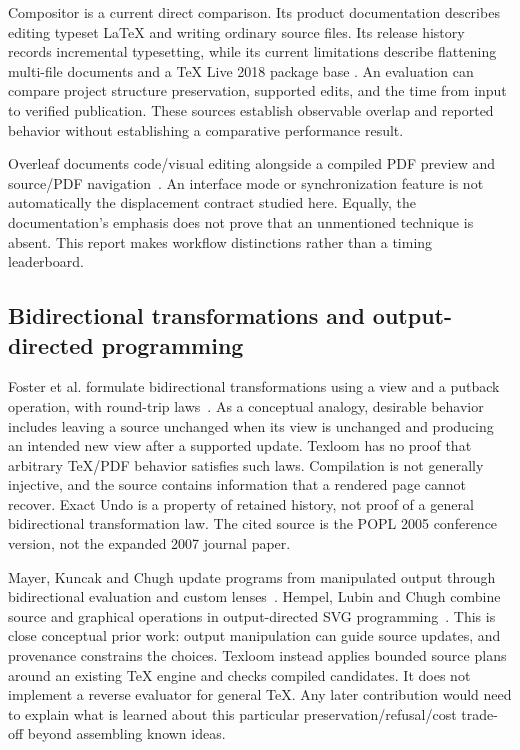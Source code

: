 Compositor is a current direct comparison. Its product documentation describes
editing typeset LaTeX and writing ordinary source files. Its release history
records incremental typesetting, while its current limitations describe
flattening multi-file documents and a TeX Live 2018 package base
\cite{compositor,compositorincremental}. An evaluation can compare project
structure preservation, supported edits, and the time from input to
verified publication. These sources establish observable overlap and
reported behavior without establishing a comparative performance result.

Overleaf documents code/visual editing alongside a compiled PDF preview and
source/PDF navigation~\cite{overleaf}. An interface mode or synchronization
feature is not automatically the displacement contract studied here. Equally,
the documentation's emphasis does not prove that an unmentioned technique is
absent. This report makes workflow distinctions rather than a timing leaderboard.

\subsection{Bidirectional transformations and output-directed programming}
Foster et al. formulate bidirectional transformations using a view and a
putback operation, with round-trip laws~\cite{foster2005}. As a conceptual
analogy, desirable behavior includes leaving a source unchanged when its view
is unchanged and producing an intended new view after a supported update.
Texloom has no proof that arbitrary TeX/PDF behavior satisfies such laws.
Compilation is not generally injective, and the source contains information
that a rendered page cannot recover. Exact Undo is a property of retained
history, not proof of a general bidirectional transformation law. The cited
source is the POPL 2005 conference version, not the expanded 2007 journal paper.

Mayer, Kuncak and Chugh update programs from manipulated output through
bidirectional evaluation and custom lenses~\cite{mayer2018}. Hempel, Lubin and
Chugh combine source and graphical operations in output-directed SVG
programming~\cite{hempel2019}. This is close conceptual prior work: output
manipulation can guide source updates, and provenance constrains the choices.
Texloom instead applies bounded source plans around an existing TeX engine
and checks compiled candidates. It does not implement a reverse evaluator for
general TeX. Any later contribution would need to explain what is learned
about this particular preservation/refusal/cost trade-off beyond assembling
known ideas.


